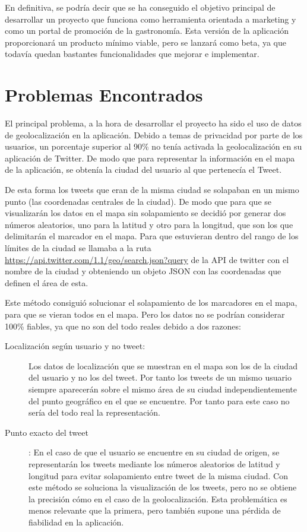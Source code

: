 En definitiva, se podría decir que se ha conseguido el objetivo principal de desarrollar un proyecto que funciona como herramienta orientada a marketing y
como un portal de promoción de la gastronomía. Esta versión de la aplicación proporcionará un producto mínimo viable, pero se lanzará como beta, ya que
todavía quedan bastantes funcionalidades que mejorar e implementar.

\section{Problemas Encontrados}

El principal problema, a la hora de desarrollar el proyecto ha sido el uso de datos de geolocalización en la aplicación. Debido a temas de privacidad por parte de los usuarios, un porcentaje superior al 90\% no tenía activada la geolocalización en su aplicación de Twitter.
De modo que para representar la información en el mapa de la aplicación, se obtenía la ciudad del usuario al que pertenecía el Tweet.

\vspace{5 mm}

De esta forma los tweets que eran de la misma ciudad se solapaban en un mismo punto (las coordenadas centrales de la ciudad). De modo que para que se visualizarán los datos en el mapa sin solapamiento se
decidió por generar dos números aleatorios, uno para la latitud y otro para la longitud, que son los que delimitarán el marcador en el mapa. Para que estuvieran dentro del rango de los límites de la ciudad
se llamaba a la ruta \url{https://api.twitter.com/1.1/geo/search.json?query} de la API de twitter con el nombre de la ciudad y obteniendo un objeto JSON con las coordenadas que definen el área
de esta.


Este método consiguió solucionar el solapamiento de los marcadores en el mapa, para que se vieran todos en el mapa. Pero los datos no se podrían considerar 100\% fiables, ya que no son del todo reales
debido a dos razones:


\begin{description}

\item [Localización según usuario y no tweet:] Los datos de localización que se muestran en el mapa son los de la ciudad del usuario y no los del tweet. Por tanto
los tweets de un mismo usuario siempre aparecerán sobre el mismo área de su ciudad independientemente del punto geográfico en el que se encuentre. Por tanto
para este caso no sería del todo real la representación.

\item [Punto exacto del tweet]: En el caso de que el usuario se encuentre en su ciudad de origen, se representarán los tweets mediante los números aleatorios de latitud
y longitud para evitar solapamiento entre tweet de la misma ciudad. Con este método se soluciona la visualización de los tweets, pero no se obtiene la precisión cómo
en el caso de la geolocalización. Esta problemática es menos relevante que la primera, pero también supone una pérdida de fiabilidad en la aplicación.

\end{description}


